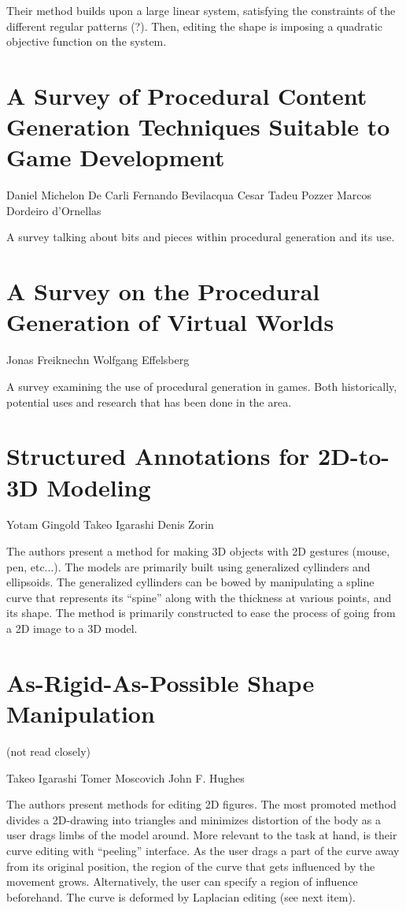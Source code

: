 Their method builds upon a large linear system, satisfying the constraints of the different regular patterns (?). Then, editing the shape is imposing a quadratic objective function on the system. 


\section*{A Survey of Procedural Content Generation Techniques Suitable to Game Development}

Daniel Michelon De Carli
Fernando Bevilacqua
Cesar Tadeu Pozzer
Marcos Dordeiro d'Ornellas

A survey talking about bits and pieces within procedural generation and its use.


\section*{A Survey on the Procedural Generation of Virtual Worlds}

Jonas Freiknechn
Wolfgang Effelsberg

A survey examining the use of procedural generation in games. Both historically, potential uses and research that has been done in the area.


\section*{Structured Annotations for 2D-to-3D Modeling}

Yotam Gingold
Takeo Igarashi
Denis Zorin

The authors present a method for making 3D objects with 2D gestures (mouse, pen, etc...). The models are primarily built using generalized cyllinders and ellipsoids. The generalized cyllinders can be bowed by manipulating a spline curve that represents its ``spine'' along with the thickness at various points, and its shape. The method is primarily constructed to ease the process of going from a 2D image to a 3D model.

\section*{As-Rigid-As-Possible Shape Manipulation} (not read closely)

Takeo Igarashi
Tomer Moscovich
John F. Hughes

The authors present methods for editing 2D figures. The most promoted method divides a 2D-drawing into triangles and minimizes distortion of the body as a user drags limbs of the model around. More relevant to the task at hand, is their curve editing with ``peeling'' interface. As the user drags a part of the curve away from its original position, the region of the curve that gets influenced by the movement grows. Alternatively, the user can specify a region of influence beforehand. The curve is deformed by Laplacian editing (see next item).



